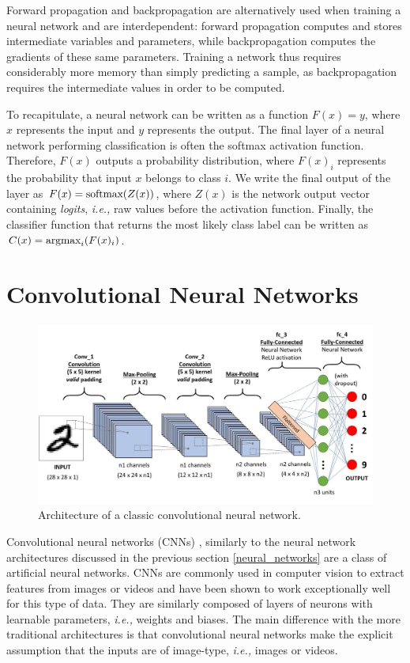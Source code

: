Forward propagation and backpropagation are alternatively used when training a
neural network and are interdependent: forward propagation computes and stores
intermediate variables and parameters, while backpropagation computes the
gradients of these same parameters. Training a network thus requires
considerably more memory than simply predicting a sample, as backpropagation
requires the intermediate values in order to be computed.

To recapitulate, a neural network can be written as a function $F(x)=y$, where
$x$ represents the input and $y$ represents the output. The final layer of a
neural network performing classification is often the softmax activation
function. Therefore, $F(x)$ outputs a probability distribution, where $F(x)_{i}$
represents the probability that input $x$ belongs to class $i$. We write the
final output of the layer as $F(x)=\textup{softmax}(Z(x))$, where $Z(x)$ is the
network output vector containing \textit{logits}, \emph{i.e.,} raw values before
the activation function. Finally, the classifier function that returns the most
likely class label can be written as $C(x)=\textup{argmax}_{i}{(F(x)_{i})}$.

\section{Convolutional Neural Networks}
\label{CNNs}

\begin{figure}[ht]
    \includegraphics[clip,width=1\columnwidth]{Figures/related/cnn.jpeg}
    \caption{ Architecture of a classic convolutional neural network. }
    \label{fig:cnn}
\end{figure}

Convolutional neural networks (CNNs) \cite{lecun_object_1999}, similarly to the
neural network architectures discussed in the previous section
\ref{neural_networks} are a class of artificial neural networks. CNNs are
commonly used in computer vision to extract features from images or videos and
have been shown to work exceptionally well for this type of data. They are
similarly composed of layers of neurons with learnable parameters, \emph{i.e.,}
weights and biases. The main difference with the more traditional architectures
is that convolutional neural networks make the explicit assumption that the
inputs are of image-type, \emph{i.e.,} images or videos.


